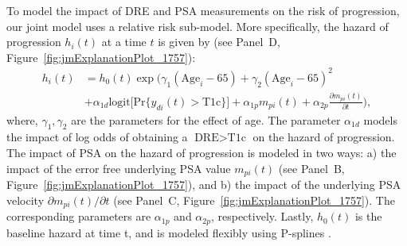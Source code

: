 To model the impact of DRE and PSA measurements on the risk of progression, our joint model uses a relative risk sub-model. More specifically, the hazard of progression $h_i(t)$ at a time $t$ is given by (see Panel~D, Figure~\ref{fig:jmExplanationPlot_1757}):
\begin{equation}
\label{eq:rel_risk_model}
\begin{split}
    h_i(t) &= h_0(t) \exp\Big(\gamma_1 (\mbox{Age}_i-65) + \gamma_2 (\mbox{Age}_i-65)^2\\
    &+\alpha_{1d} \mbox{logit} \big[\mbox{Pr}\{y_{di}(t) > \mbox{T1c}\}\big]+ \alpha_{1p} m_{pi}(t) + \alpha_{2p} \frac{\partial m_{pi}(t)}{\partial {t}}\Big),
    \end{split}
\end{equation}
where, $\gamma_1, \gamma_2$ are the parameters for the effect of age. The parameter $\alpha_{1d}$ models the impact of log odds of obtaining a $\mbox{DRE} > \mbox{T1c}$ on the hazard of progression. The impact of PSA on the hazard of progression is modeled in two ways: a) the impact of the error free underlying PSA value $m_{pi}(t)$ (see Panel~B, Figure~\ref{fig:jmExplanationPlot_1757}), and b) the impact of the underlying PSA velocity $\partial m_{pi}(t)/\partial {t}$ (see Panel~C, Figure~\ref{fig:jmExplanationPlot_1757}). The corresponding parameters are $\alpha_{1p}$ and $\alpha_{2p}$, respectively. Lastly, $h_0(t)$ is the baseline hazard at time t, and is modeled flexibly using P-splines \citep{eilers1996flexible}.

